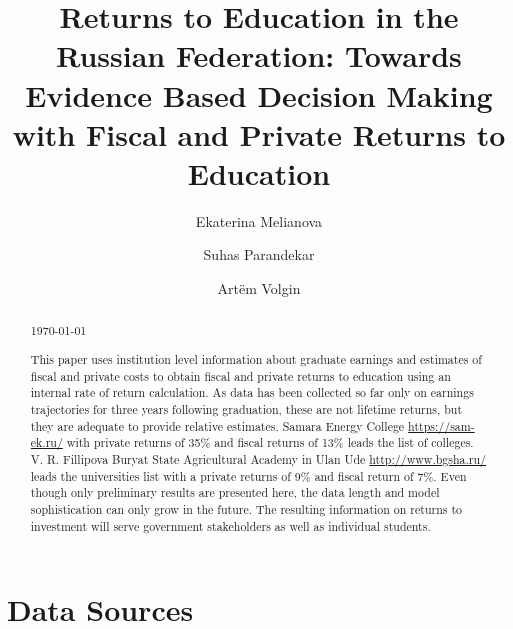 \documentclass[alpha-refs]{wiley-article-05g}
\title{Returns to Education in the Russian Federation: Towards Evidence Based Decision Making with Fiscal and Private Returns to Education}
\author[*]{Ekaterina Melianova}
\author[*]{\hspace{-1em}Suhas Parandekar}
\author[*]{\hspace{-1em}Art\"{e}m Volgin}
\affil[*]{Education Global Practice, Europe and Central Asia}
\begin{document}
	
\setcounter{page}{1} 

\maketitle

\begin{abstract}
	
\vspace{.5em} \today	
	
\vspace{.5em}
This paper uses institution 
level information about graduate earnings and estimates of fiscal and 
private costs to obtain fiscal and private returns to education using an 
internal rate of return calculation. As data has been collected so far only 
on earnings trajectories for three years following graduation, these are 
not lifetime returns, but they are adequate to provide relative estimates. 
Samara Energy College \url{https://sam-ek.ru/} with private returns of 35\% 
and fiscal returns of 13\% leads the list of colleges. V. R. Fillipova 
Buryat State Agricultural 
Academy in Ulan Ude \url{http://www.bgsha.ru/} leads the universities list 
with a private returns of 9\% and fiscal return of 7\%. Even though only 
preliminary results are presented here, the data length and 
model sophistication can only grow in the future. The resulting information 
on returns to investment will serve government stakeholders as well as 
individual students.  

\end{abstract}

\section{Data Sources}
\end{document}
